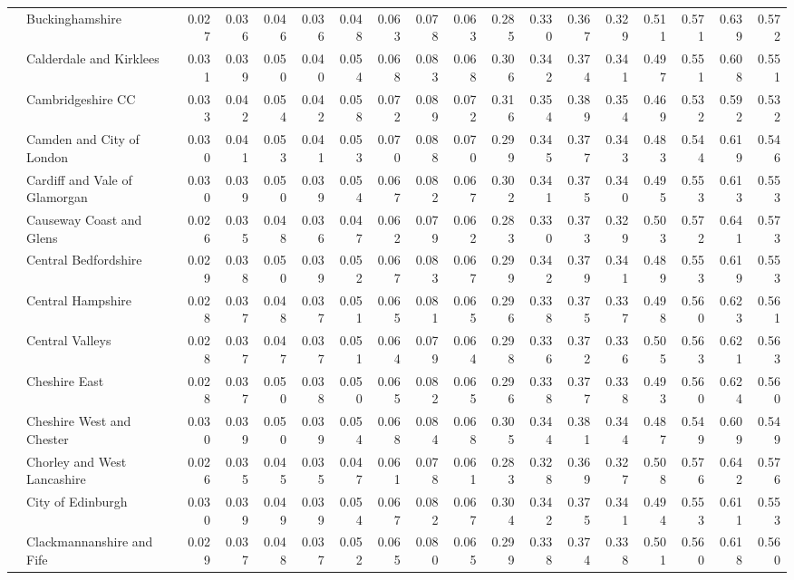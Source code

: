 \begin{tabular}{llrrrrrrrrrrrrrrrr}
 & Buckinghamshire & 0.027 & 0.036 & 0.046 & 0.036 & 0.048 & 0.063 & 0.078 & 0.063 & 0.285 & 0.330 & 0.367 & 0.329 & 0.511 & 0.571 & 0.639 & 0.572 \\
 & Calderdale and Kirklees & 0.031 & 0.039 & 0.050 & 0.040 & 0.054 & 0.068 & 0.083 & 0.068 & 0.306 & 0.342 & 0.374 & 0.341 & 0.497 & 0.551 & 0.608 & 0.551 \\
 & Cambridgeshire CC & 0.033 & 0.042 & 0.054 & 0.042 & 0.058 & 0.072 & 0.089 & 0.072 & 0.316 & 0.354 & 0.389 & 0.354 & 0.469 & 0.532 & 0.592 & 0.532 \\
 & Camden and City of London & 0.030 & 0.041 & 0.053 & 0.041 & 0.053 & 0.070 & 0.088 & 0.070 & 0.299 & 0.345 & 0.377 & 0.343 & 0.483 & 0.544 & 0.619 & 0.546 \\
 & Cardiff and Vale of Glamorgan & 0.030 & 0.039 & 0.050 & 0.039 & 0.054 & 0.067 & 0.082 & 0.067 & 0.302 & 0.341 & 0.375 & 0.340 & 0.495 & 0.553 & 0.613 & 0.553 \\
 & Causeway Coast and Glens & 0.026 & 0.035 & 0.048 & 0.036 & 0.047 & 0.062 & 0.079 & 0.062 & 0.283 & 0.330 & 0.373 & 0.329 & 0.503 & 0.572 & 0.641 & 0.573 \\
 & Central Bedfordshire & 0.029 & 0.038 & 0.050 & 0.039 & 0.052 & 0.067 & 0.083 & 0.067 & 0.299 & 0.342 & 0.379 & 0.341 & 0.489 & 0.553 & 0.619 & 0.553 \\
 & Central Hampshire & 0.028 & 0.037 & 0.048 & 0.037 & 0.051 & 0.065 & 0.081 & 0.065 & 0.296 & 0.338 & 0.375 & 0.337 & 0.498 & 0.560 & 0.623 & 0.561 \\
 & Central Valleys & 0.028 & 0.037 & 0.047 & 0.037 & 0.051 & 0.064 & 0.079 & 0.064 & 0.298 & 0.336 & 0.372 & 0.336 & 0.505 & 0.563 & 0.621 & 0.563 \\
 & Cheshire East & 0.028 & 0.037 & 0.050 & 0.038 & 0.050 & 0.065 & 0.082 & 0.065 & 0.296 & 0.338 & 0.377 & 0.338 & 0.493 & 0.560 & 0.624 & 0.560 \\
 & Cheshire West and Chester & 0.030 & 0.039 & 0.050 & 0.039 & 0.054 & 0.068 & 0.084 & 0.068 & 0.305 & 0.344 & 0.381 & 0.344 & 0.487 & 0.549 & 0.609 & 0.549 \\
 & Chorley and West Lancashire & 0.026 & 0.035 & 0.045 & 0.035 & 0.047 & 0.061 & 0.078 & 0.061 & 0.283 & 0.328 & 0.369 & 0.327 & 0.508 & 0.576 & 0.642 & 0.576 \\
 & City of Edinburgh & 0.030 & 0.039 & 0.049 & 0.039 & 0.054 & 0.067 & 0.082 & 0.067 & 0.304 & 0.342 & 0.375 & 0.341 & 0.494 & 0.553 & 0.611 & 0.553 \\
 & Clackmannanshire and Fife & 0.029 & 0.037 & 0.048 & 0.037 & 0.052 & 0.065 & 0.080 & 0.065 & 0.299 & 0.338 & 0.374 & 0.338 & 0.501 & 0.560 & 0.618 & 0.560 \\

\end{tabular}
